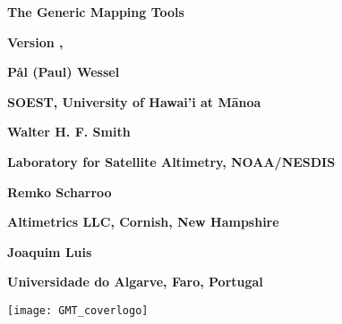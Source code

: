 %
%

\thispagestyle{empty}

\begin{center}
\Huge
\textbf{The Generic Mapping Tools}\par 
\vspace{0.5\baselineskip}
\textbf{\GMTTITLE}\par 

\large
\vspace{0.5\baselineskip}
\textbf{Version \GMTDOCVERSION, \GMTDOCDATE}\par 
\vspace{0.25\baselineskip}

\vspace{2.0\baselineskip}

\huge
\textbf{P\aa l (Paul) Wessel}\par 
\vspace{0.5\baselineskip}

\Large
\textbf{SOEST, University of Hawai'i at M\={a}noa}\par 
\vspace{0.5\baselineskip}

\huge
\textbf{Walter H. F. Smith}\par 
\vspace{0.5\baselineskip}

\Large
\textbf{Laboratory for Satellite Altimetry, NOAA/NESDIS}\par 
\vspace{0.5\baselineskip}

\huge
\textbf{Remko Scharroo}\par 
\vspace{0.5\baselineskip}

\Large
\textbf{Altimetrics LLC, Cornish, New Hampshire}\par 
\vspace{0.5\baselineskip}

\huge
\textbf{Joaquim Luis}\par 
\vspace{0.5\baselineskip}

\Large
\textbf{Universidade do Algarve, Faro, Portugal}\par 
\vspace{0.5\baselineskip}


\texttt{[image: GMT\_coverlogo]}
\end{center}
